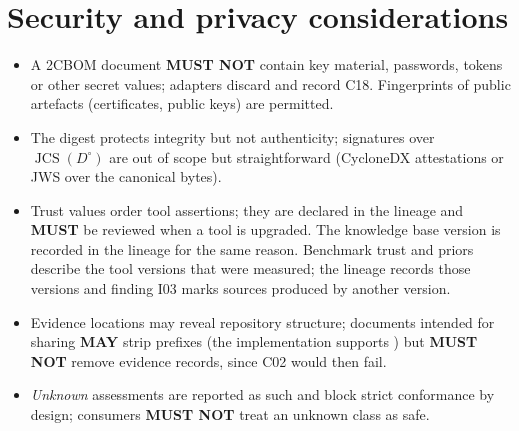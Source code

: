 \documentclass[11pt,a4paper]{article}
\newcommand{\twocbom}{2CBOM}
\newcommand{\MUST}{\textbf{MUST}}
\newcommand{\MUSTNOT}{\textbf{MUST NOT}}
\newcommand{\MAY}{\textbf{MAY}}
\newcommand{\JCS}{\operatorname{JCS}}
\theoremstyle{definition}
\theoremstyle{plain}
\begin{document}
\section{Security and privacy considerations}\label{sec:security}
\begin{itemize}[nosep]
\item A \twocbom{} document \MUSTNOT{} contain key material, passwords, tokens or other secret
      values; adapters discard  and record C18.
      Fingerprints of public artefacts (certificates, public keys) are permitted.
\item The digest protects integrity but not authenticity; signatures over $\JCS(D^{\circ})$ are
      out of scope but straightforward (CycloneDX attestations or JWS over the canonical bytes).
\item Trust values order tool assertions; they are declared in the lineage and \MUST{} be reviewed
      when a tool is upgraded. The knowledge base version is recorded in the lineage for the same
      reason. Benchmark trust and priors describe the tool versions that were measured; the lineage
      records those versions and finding I03 marks sources produced by another version.
\item Evidence locations may reveal repository structure; documents intended for sharing \MAY{}
      strip prefixes (the implementation supports ) but \MUSTNOT{} remove
      evidence records, since C02 would then fail.
\item \emph{Unknown} assessments are reported as such and block strict conformance by design;
      consumers \MUSTNOT{} treat an unknown class as safe.
\end{itemize}

\appendix
\end{document}
